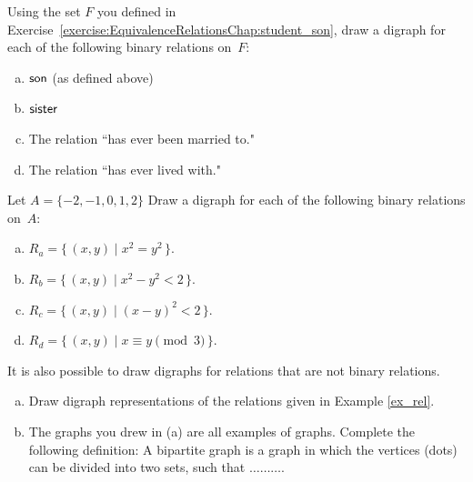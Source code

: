  \begin{exer} \label{DrawBinRelExer}
Using the set $F$ you defined in Exercise~\ref{exercise:EquivalenceRelationsChap:student_son}, draw a digraph for each of the following binary relations on~$F$: 
 \begin{enumerate}[(a)]
 \item \label{DrawBinRelExer-son}
 $\sf{son}$  (as defined above) 
 \item \label{DrawBinRelExer-sister}
 $\sf{sister}$
 \item \label{DrawBinRelExer-married}
 The relation ``has ever been married to."
  \item \label{DrawBinRelExer-lived}
 The relation ``has ever lived with."
 \end{enumerate}
 \end{exer}
 
 \begin{exer} \label{DrawBinRelExer}
Let $A =  \{-2,-1,0,1,2\}$ Draw a digraph for each of the following binary relations on~$A$: 
 \begin{enumerate}[(a)]
 \item \label{DrawBinRelExer-son}
 $R_a = \{\, (x,y) \mid  x^2 = y^2 \,\} .$
 \item \label{DrawBinRelExer-sister}
$ R_b = \{\, (x,y) \mid  x^2 - y^2 < 2 \,\} .$
 \item \label{DrawBinRelExer-married}
 $ R_c = \{\, (x,y) \mid  (x-y)^2 < 2 \,\} .$
  \item \label{DrawBinRelExer-lived}
$ R_d = \{\, (x,y) \mid  x\equiv y \pmod{3} \,\} .$
 \end{enumerate}
 \end{exer}

 \begin{exer} \label{DrawBinRelExer2}
It is also possible to draw digraphs for relations that are not binary relations.  
 \begin{enumerate}[(a)]
 \item \label{DrawBinRelExer-son}
Draw digraph representations of the relations given in Example \ref{ex_rel}.
 \item \label{DrawBinRelExer-sister}
The graphs you drew in (a) are all examples of  graphs.  Complete the following definition:  A bipartite graph is a graph in which the vertices (dots) can be divided into two  sets, such that $\ldots \ldots \ldots$.
 \end{enumerate}
 \end{exer}


